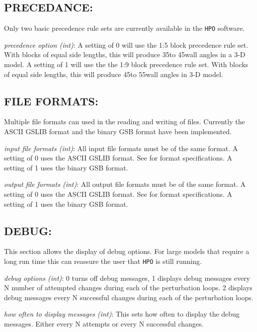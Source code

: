     \subsection{PRECEDANCE:}
        Only two basic precedence rule sets are currently available in the \texttt{HPO} software.

        \textit{precedence option (int)}: A setting of 0 will use the 1:5 block precedence rule set. With blocks of equal side lengths, this will produce 35\textdegree to 45\textdegree wall angles in a 3-D model. A setting of 1 will use the the 1:9 block precedence rule set. With blocks of equal side lengths, this will produce 45\textdegree to 55\textdegree wall angles in 3-D model.

    \subsection{FILE FORMATS:}
        Multiple file formats can used in the reading and writing of files. Currently the ASCII GSLIB format and the binary GSB format have been implemented.

        \textit{input file formats (int)}: All input file formats must be of the same format. A setting of 0 uses the ASCII GSLIB format. See \cite{Deutsch1998} for format specifications. A setting of 1 uses the binary GSB format.

        \textit{output file formats (int)}: All output file formats must be of the same format. A setting of 0 uses the ASCII GSLIB format. See \cite{Deutsch1998} for format specifications. A setting of 1 uses the binary GSB format.

    \subsection{DEBUG:}
        This section allows the display of debug options. For large models that require a long run time this can reassure the user that \texttt{HPO} is still running.

        \textit{debug options (int)}: 0 turns off debug messages, 1 displays debug messages every N number of attempted changes during each of the perturbation loops. 2 displays debug messages every N successful changes during each of the perturbation loops.

        \textit{how often to display messages (int)}: This sets how often to display the debug messages. Either every N attempts or every N successful changes.

